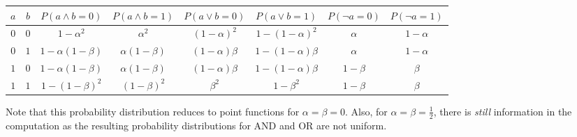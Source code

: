 \begin{center}
    \begin{tabular}{c|c||c|c||c|c||c|c}
        $a$                            & $b$                            &
        $P\left(a \land b = 0\right)$  & $P\left(a \land b = 1\right)$  &
        $P\left(a \lor b = 0\right)$   & $P\left(a \lor b = 1\right)$   &
        $P\left(\neg a = 0\right)$     & $P\left(\neg a = 1\right)$       \\
        \hline
        $0$                            & $0$                            &
        $1-\alpha^2$                   & $\alpha^2$                     &
        $\left(1-\alpha\right)^2$      & $1-\left(1-\alpha\right)^2$    &
        $\alpha$                       & $1-\alpha$                       \\
        $0$                            & $1$                            &
        $1-\alpha\left(1-\beta\right)$ & $\alpha\left(1-\beta\right)$   &
        $\left(1-\alpha\right)\beta$   & $1-\left(1-\alpha\right)\beta$ &
        $\alpha$                       & $1-\alpha$                       \\
        $1$                            & $0$                            &
        $1-\alpha\left(1-\beta\right)$ & $\alpha\left(1-\beta\right)$   &
        $\left(1-\alpha\right)\beta$   & $1-\left(1-\alpha\right)\beta$ &
        $1-\beta$                      & $\beta$                          \\
        $1$                            & $1$                            &
        $1-\left(1-\beta\right)^2$     & $\left(1-\beta\right)^2$       &
        $\beta^2$                      & $1-\beta^2$                    &
        $1-\beta$                      & $\beta$                          \\
    \end{tabular}
\end{center}

Note that this probability distribution reduces to point functions for $\alpha = \beta = 0$. Also, for $\alpha = \beta = \frac{1}{2}$, there is {\em still} information in the computation as the resulting probability distributions for AND and OR are not uniform.

